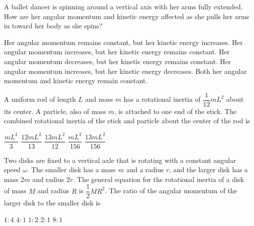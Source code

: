 \documentclass{../../../oss-apphys-exam}
\begin{document}
\begin{questions}
  \question A ballet dancer is spinning around a vertical axis with her arms
  fully extended. How are her angular momentum and kinetic energy affected
  as she pulls her arms in toward her body as she spins?
  \begin{choices}
    \choice Her angular momentum remains constant, but her kinetic energy
    increases.
    \choice Her angular momentum increases, but her kinetic energy remains
    constant.
    \choice Her angular momentum decreases, but her kinetic energy remains
    constant.
    \choice Her angular momentum increases, but her kinetic energy decreases.
    \choice Both her angular momentum and kinetic energy remain constant.
  \end{choices}
  \newpage
  
  \question A uniform rod of length $L$ and mass $m$ has a rotational inertia
  of $\dfrac1{12}mL^2$ about its center. A particle, also of mass $m$, is
  attached to one end of the stick. The combined rotational inertia of the
  stick and particle about the center of the rod is
  \begin{center}
  \end{center}
  \begin{choices}
    \choice$\dfrac{mL^2}3$
    \choice$\dfrac{12mL^2}{13}$
    \choice$\dfrac{13mL^2}{12}$
    \choice$\dfrac{mL^2}{156}$
    \choice$\dfrac{13mL^2}{156}$
  \end{choices}
    
  \question Two disks are fixed to a vertical axle that is rotating with a
  constant angular speed $\omega$. The smaller disk has a mass $m$ and a radius
  $r$, and the larger disk has a mass $2m$ and radius $2r$. The general
  equation for the rotational inertia of a disk of mass $M$ and radius $R$ is
  $\dfrac12MR^2$. The ratio of the angular momentum of the larger disk to the
  smaller disk is
  \begin{choices}
    \choice $1:4$
    \choice $4:1$
    \choice $1:2$
    \choice $2:1$
    \choice $8:1$
  \end{choices}
  \newpage
  

\end{questions}
\end{document}
